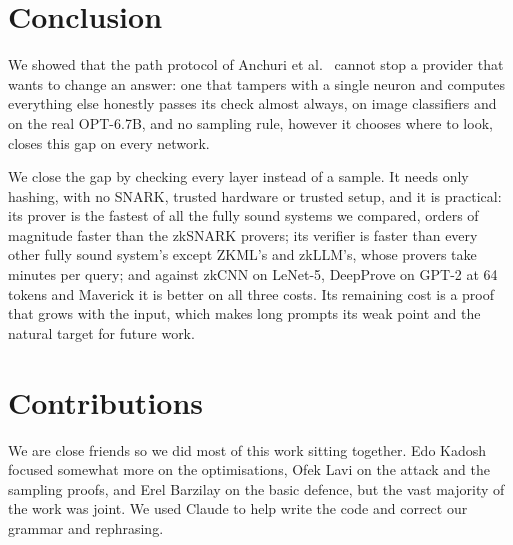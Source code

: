 \documentclass[sigconf,nonacm]{acmart}
\begin{document}
\section{Conclusion}
We showed that the path protocol of Anchuri et al.~\cite{anchuri2026verifiable} cannot stop a
provider that wants to change an answer: one that tampers with a single neuron and computes
everything else honestly passes its check almost always, on image classifiers and on the real
OPT-6.7B, and no sampling rule, however it chooses where to look, closes this gap on every network.

We close the gap by checking every layer instead of a sample. It needs only hashing, with no SNARK, trusted
hardware or trusted setup, and it is practical: its prover is the fastest of all the fully sound systems we compared, orders of magnitude faster than the zkSNARK provers; its verifier is faster than every other fully sound system's except ZKML's and zkLLM's, whose provers take minutes per query; and against zkCNN on LeNet-5, DeepProve on GPT-2 at 64 tokens and Maverick it is better on all three costs. Its remaining cost is a proof that grows with the input, which makes long prompts its
weak point and the natural target for future work.

\section{Contributions}
We are close friends so we did most of this work sitting together. Edo Kadosh focused somewhat more
on the optimisations, Ofek Lavi on the attack and the sampling proofs, and Erel Barzilay on the
basic defence, but the vast majority of the work was joint. We used Claude to help write the code
and correct our grammar and rephrasing.

\newpage


\end{document}

